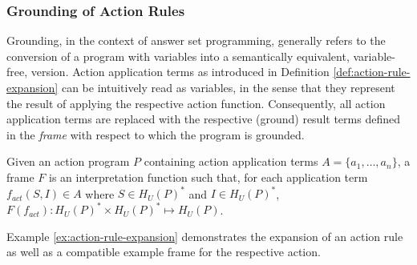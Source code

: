 
\subsubsection{Grounding of Action Rules}
\label{subsubsec:evolog-actions-semantics-grounding}

Grounding, in the context of answer set programming, generally refers to the conversion of a program with variables into a semantically equivalent, variable-free, version. Action application terms as introduced in Definition \ref{def:action-rule-expansion} can be intuitively read as variables, in the sense that they represent the result of applying the respective action function. Consequently, all action application terms are replaced with the respective (ground) result terms defined in the \emph{frame} with respect to which the program is grounded.

\begin{definition}[Frame]
\label{def:evolog-frame}
Given an action program $P$ containing action application terms $A = \{a_1,\ldots,a_n\}$, a frame $F$ is an interpretation function such that, for each application term $f_{act}(S, I) \in A$ where $S \in H_{U}(P)^{*}$ and $I \in H_{U}(P)^{*}$, $F(f_{act}): H_{U}(P)^{*} \times H_{U}(P)^{*} \mapsto H_{U}(P)$.
\end{definition}

Example \ref{ex:action-rule-expansion} demonstrates the expansion of an action rule as well as a compatible example frame for the respective action.

